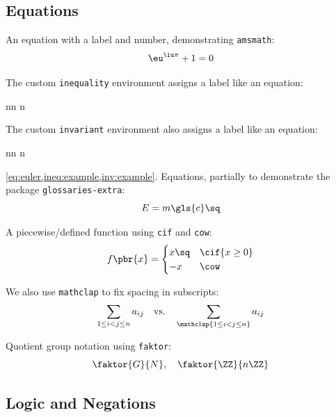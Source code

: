 \subsection{Equations}

An equation with a label and number, demonstrating \texttt{amsmath}:
\begin{equation}\label{eq:euler}
    \eu^{\iu\pi} + 1 = 0
\end{equation}

The custom \texttt{inequality} environment assigns a label like an equation:
\begin{inequality}\label{ineq:example}
    n\sq \geq n \quad {} n 
\end{inequality}

The custom \texttt{invariant} environment also assigns a label like an equation:
\begin{invariant}\label{inv:example}
    n\sq \geq n \quad {} n 
\end{invariant}

\cref{eq:euler,ineq:example,inv:example}. Equations, partially to demonstrate the package \texttt{glossaries-extra}:
\begin{equation*}
    E = m\gls{c}\sq
\end{equation*}

A piecewise\-/defined function using \texttt{cif} and \texttt{cow}:
\begin{equation*}
    f\pbr{x} = \begin{cases}
        x\sq & \cif{x \geq 0} \\
        -x   & \cow
    \end{cases}
\end{equation*}

We also use \texttt{mathclap} to fix spacing in subscripts:
\begin{equation*}
    \sum_{1 \leq i < j \leq n} a_{ij}
    \quad \text{vs.} \quad
    \sum_{\mathclap{1 \leq i < j \leq n}} a_{ij}
\end{equation*}

Quotient group notation using \texttt{faktor}:
\begin{equation*}
    \faktor{G}{N}, \quad \faktor{\ZZ}{n\ZZ}
\end{equation*}

\subsection{Logic and Negations}

